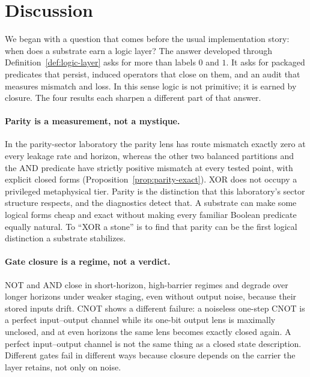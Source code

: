 \section{Discussion}
\label{sec:discussion}

We began with a question that comes before the usual implementation story: when does a substrate earn a logic layer? The answer developed through Definition~\ref{def:logic-layer} asks for more than labels \(0\) and \(1\). It asks for packaged predicates that persist, induced operators that close on them, and an audit that measures mismatch and loss. In this sense logic is not primitive; it is earned by closure. The four results each sharpen a different part of that answer.

\paragraph{Parity is a measurement, not a mystique.}
In the parity-sector laboratory the parity lens has route mismatch exactly zero at every leakage rate and horizon, whereas the other two balanced partitions and the AND predicate have strictly positive mismatch at every tested point, with explicit closed forms (Proposition~\ref{prop:parity-exact}). XOR does not occupy a privileged metaphysical tier. Parity is the distinction that this laboratory's sector structure respects, and the diagnostics detect that. A substrate can make some logical forms cheap and exact without making every familiar Boolean predicate equally natural. To ``XOR a stone'' is to find that parity can be the first logical distinction a substrate stabilizes.

\paragraph{Gate closure is a regime, not a verdict.}
NOT and AND close in short-horizon, high-barrier regimes and degrade over longer horizons under weaker staging, even without output noise, because their stored inputs drift. CNOT shows a different failure: a noiseless one-step CNOT is a perfect input--output channel while its one-bit output lens is maximally unclosed, and at even horizons the same lens becomes exactly closed again. A perfect input--output channel is not the same thing as a closed state description. Different gates fail in different ways because closure depends on the carrier the layer retains, not only on noise.

